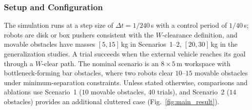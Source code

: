 \subsubsection{Setup and Configuration}\label{subsec:sim-setup}

The simulation runs at a step size of $\Delta t=1/240$\,s with a control period
of $1/40$\,s; robots are disk or box pushers consistent with the $W$-clearance
definition, and movable obstacles have masses $[5,15]$\,kg in Scenarios~1--2, $[20,30]$\,kg in the generalization studies. A trial
succeeds when the external vehicle reaches its goal through a $W$-clear path. The
nominal scenario is an $8\times5$\,m workspace with bottleneck-forming bar
obstacles, where two robots clear $10$--$15$ movable obstacles under
minimum-separation constraints. Unless stated otherwise, comparisons and
ablations use Scenario~1 ($10$ movable obstacles, $40$ trials), and Scenario~2
($14$ obstacles) provides an additional cluttered case
(Fig.~\ref{fig:main_result}). 



